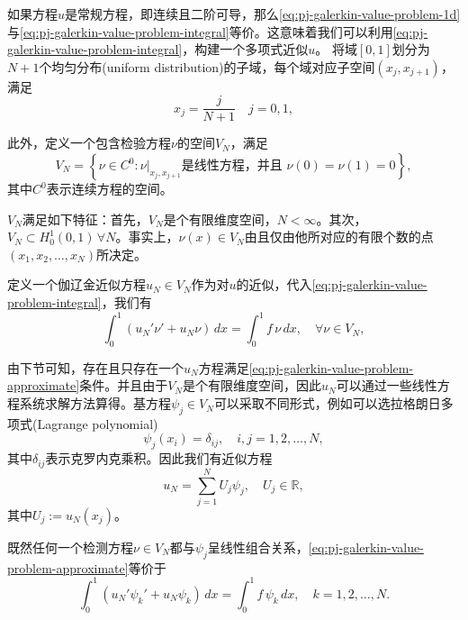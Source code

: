 \begin{subappendices}
如果方程$u$是常规方程，即连续且二阶可导，那么\eqref{eq:pj-galerkin-value-problem-1d}与\eqref{eq:pj-galerkin-value-problem-integral}等价。这意味着我们可以利用\eqref{eq:pj-galerkin-value-problem-integral}，构建一个多项式近似$u$。
将域$\left[ 0,1 \right]$划分为$N+1$个均匀分布(uniform distribution)的子域，每个域对应子空间$(x_j,x_{j+1})$，满足
 \begin{equation*}
   x_j = \frac{j}{N+1} \quad j=0,1, %
 \end{equation*}

此外，定义一个包含检验方程$\nu$的空间$V_N$，满足
\begin{equation*}
  V_N = \left\{ \nu \in C^{0} : \nu |_{x_j,x_{j+1}} \text{是线性方程，并且  } \nu(0) = \nu(1) = 0 \right\},
\end{equation*}
其中$C^{0}$表示连续方程的空间。

$V_N$满足如下特征：首先，$V_N$是个有限维度空间，$N < \infty$。其次，$V_N \subset H_0^1(0,1) \, \forall N$。事实上，$\nu(x) \in V_N$由且仅由他所对应的有限个数的点$(x_1,x_2,\ldots,x_N)$所决定。

定义一个伽辽金近似方程$u_N \in V_N$作为对$u$的近似，代入\eqref{eq:pj-galerkin-value-problem-integral}，我们有
\begin{equation}
  \label{eq:pj-galerkin-value-problem-approximate}
  \int_{0}^{1} \left( u_N' \nu' + u_N \nu \right) \, dx = \int_{0}^{1} f \, \nu \, dx, \quad \forall \nu \in V_N,
\end{equation}

由下节可知，存在且只存在一个$u_N$方程满足\eqref{eq:pj-galerkin-value-problem-approximate}条件。并且由于$V_N$是个有限维度空间，因此$u_N$可以通过一些线性方程系统求解方法算得。基方程$\psi_j \in V_N$可以采取不同形式，例如可以选拉格朗日多项式(Lagrange polynomial)
\begin{equation}
  \label{eq:pj-galerkin-psi-kronecker}
  \psi_j(x_i) = \delta_{ij}, \quad i,j=1,2,\ldots,N,
\end{equation}
其中$\delta_{ij}$表示克罗内克乘积。因此我们有近似方程
\begin{equation}
  \label{eq:pj-galerkin-approx-fun}
  u_N = \sum_{j=1}^{N} U_j \psi_j, \quad U_j \in \mathbb{R},
\end{equation}
其中$U_j := u_N(x_j)$。

既然任何一个检测方程$\nu \in V_N$都与$\psi_j$呈线性组合关系，\eqref{eq:pj-galerkin-value-problem-approximate}等价于
\begin{equation}
  \label{eq:pj-galerkin-value-problem-nupsik}
  \int_{0}^{1} \left( u_N' \psi_k' + u_N \psi_k \right) \, dx = \int_{0}^{1} f \, \psi_k \, dx, \quad k=1,2,\ldots,N.
\end{equation}


\end{subappendices}
